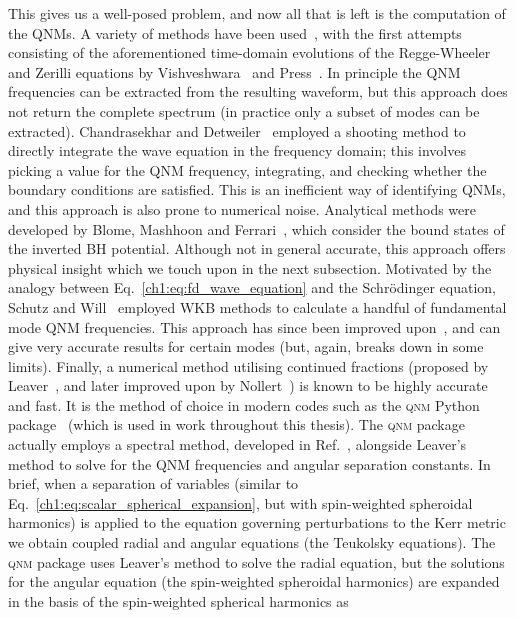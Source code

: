 This gives us a well-posed problem, and now all that is left is the computation of the QNMs. 
A variety of methods have been used~\cite{Kokkotas:1999bd, Berti:2004md}, with the first attempts consisting of the aforementioned time-domain evolutions of the Regge-Wheeler and Zerilli equations by Vishveshwara~\cite{Vishveshwara:1970zz} and Press~\cite{Press:1971wr}. 
In principle the QNM frequencies can be extracted from the resulting waveform, but this approach does not return the complete spectrum (in practice only a subset of modes can be extracted).
Chandrasekhar and Detweiler~\cite{Chandrasekhar:1975zza} employed a shooting method to directly integrate the wave equation in the frequency domain; this involves picking a value for the QNM frequency, integrating, and checking whether the boundary conditions are satisfied. 
This is an inefficient way of identifying QNMs, and this approach is also prone to numerical noise.
Analytical methods were developed by Blome, Mashhoon and Ferrari~\cite{BLOME1984231, Ferrari:1984ozr, Ferrari:1984zz}, which consider the bound states of the inverted BH potential. 
Although not in general accurate, this approach offers physical insight which we touch upon in the next subsection.
Motivated by the analogy between Eq.~\ref{ch1:eq:fd_wave_equation} and the Schr\"{o}dinger equation, Schutz and Will~\cite{Schutz:1985km} employed WKB methods to calculate a handful of fundamental mode QNM frequencies.
This approach has since been improved upon~\cite{Iyer:1986np, Matyjasek:2017psv, Konoplya:2019hlu}, and can give very accurate results for certain modes (but, again, breaks down in some limits). 
Finally, a numerical method utilising continued fractions (proposed by Leaver~\cite{Leaver:1985ax}, and later improved upon by Nollert~\cite{Nollert:1993zz}) is known to be highly accurate and fast.
It is the method of choice in modern codes such as the \textsc{qnm} Python package~\cite{Stein:2019mop} (which is used in work throughout this thesis).
The \textsc{qnm} package actually employs a spectral method, developed in Ref.~\cite{Cook:2014cta}, alongside Leaver's method to solve for the QNM frequencies and angular separation constants. 
In brief, when a separation of variables (similar to Eq.~\ref{ch1:eq:scalar_spherical_expansion}, but with spin-weighted spheroidal harmonics) is applied to the equation governing perturbations to the Kerr metric we obtain coupled radial and angular equations (the Teukolsky equations). 
The \textsc{qnm} package uses Leaver's method to solve the radial equation, but the solutions for the angular equation (the spin-weighted spheroidal harmonics) are expanded in the basis of the spin-weighted spherical harmonics as
